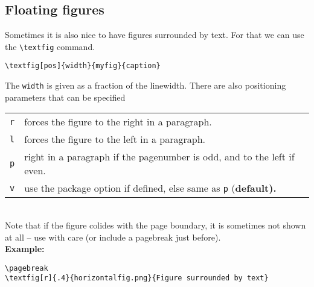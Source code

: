 \documentclass[a4paper,11pt]{article}
\begin{document}
\subsection{Floating figures}
Sometimes it is also nice to have figures surrounded by text. For that we can
use the \verb|\textfig| command.
\begin{verbatim}
\textfig[pos]{width}{myfig}{caption}
\end{verbatim}
The {\tt width} is given as a fraction of the linewidth. There are also
positioning parameters that can be specified\\

\begin{tabular}{rl}
  {\tt r} & forces the figure to the right in a paragraph. \\
  {\tt l} & forces the figure to the left in a paragraph. \\
  {\tt p} & right in a paragraph if the pagenumber is odd, and to the left if
  even. \\
  {\tt v} & use the package option if defined, else same as {\tt p} (\bf default).
\end{tabular}\\

Note that if the figure colides with the page boundary, it is sometimes not
shown at all -- use with care (or include a pagebreak just before).\\

{\bf Example:}
\begin{verbatim}
\pagebreak
\textfig[r]{.4}{horizontalfig.png}{Figure surrounded by text}
\end{verbatim}

\pagebreak
{}
{\color{gray}
\blindtext}


  
\end{document}
